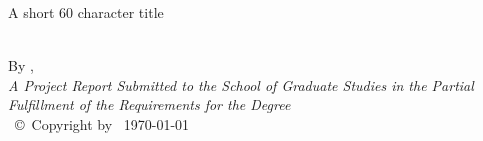 \documentclass[
12pt, %
oneside, %
english, %
onehalfpacing, %
]{McMasterThesis} %
\author{Shuo \textsc{Hou}} %
\begin{document}
 \frontmatter %

\pagestyle{plain} %

\vspace{6cm}
\begin{center}
A short 60 character title %
\end{center}
\clearpage

\begin{center}

\vfill
\textsc{\Large \ttitle} \\

\vfill
By \authorname, \\%

 \vfill
{\large \textit{A Project Report Submitted to the School of Graduate Studies in the Partial Fulfillment of the Requirements for the Degree \degreename}}\\

\vfill
{\large \univname\, \copyright\, Copyright by \authorname\, \today}\\[4cm] %

\end{center}


\newpage
{} %
\setcounter{page}{2} %
\end{document}
